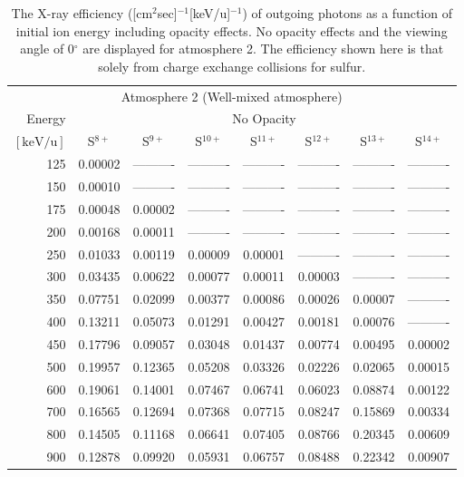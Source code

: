 \begin{table}[ht]
    \centering
    \caption{The X-ray efficiency ([cm$^2$sec]$^{-1}$[keV/u]$^{-1}$) of outgoing photons as a function of initial ion energy including opacity effects. No opacity effects and the viewing angle of 0$^\circ$ are displayed for atmosphere 2. The efficiency shown here is that solely from charge exchange collisions for sulfur.}
    \begin{tabular}{r|c|c|c|c|c|c|c}
    \multicolumn{8}{c}{Atmosphere 2 (Well-mixed atmosphere)} \\ \cline{2-8}
    Energy & \multicolumn{7}{c}{No Opacity} \\ \cline{2-8}
    $\mathrm{[keV/u]}$ & S$^{8+}$ & S$^{9+}$ & S$^{10+}$ & S$^{11+}$ & S$^{12+}$ & S$^{13+}$ & S$^{14+}$ \\ \cline{1-8}
      125 & 0.00002 & ---------- & ---------- & ---------- & ---------- & ---------- & ---------- \\
      150 & 0.00010 & ---------- & ---------- & ---------- & ---------- & ---------- & ---------- \\
      175 & 0.00048 & 0.00002 & ---------- & ---------- & ---------- & ---------- & ---------- \\
      200 & 0.00168 & 0.00011 & ---------- & ---------- & ---------- & ---------- & ---------- \\
      250 & 0.01033 & 0.00119 & 0.00009 & 0.00001 & ---------- & ---------- & ---------- \\
      300 & 0.03435 & 0.00622 & 0.00077 & 0.00011 & 0.00003 & ---------- & ---------- \\
      350 & 0.07751 & 0.02099 & 0.00377 & 0.00086 & 0.00026 & 0.00007 & ---------- \\
      400 & 0.13211 & 0.05073 & 0.01291 & 0.00427 & 0.00181 & 0.00076 & ---------- \\
      450 & 0.17796 & 0.09057 & 0.03048 & 0.01437 & 0.00774 & 0.00495 & 0.00002 \\
      500 & 0.19957 & 0.12365 & 0.05208 & 0.03326 & 0.02226 & 0.02065 & 0.00015 \\
      600 & 0.19061 & 0.14001 & 0.07467 & 0.06741 & 0.06023 & 0.08874 & 0.00122 \\
      700 & 0.16565 & 0.12694 & 0.07368 & 0.07715 & 0.08247 & 0.15869 & 0.00334 \\
      800 & 0.14505 & 0.11168 & 0.06641 & 0.07405 & 0.08766 & 0.20345 & 0.00609 \\
      900 & 0.12878 & 0.09920 & 0.05931 & 0.06757 & 0.08488 & 0.22342 & 0.00907 \\

\end{tabular}
\end{table}
